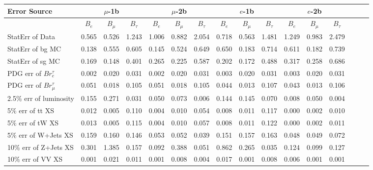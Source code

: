 \begin{sidewaystable}[p]
  \small
  \renewcommand{\arraystretch}{1.2}
  \centering

  \begin{tabular}{|l|ccc|ccc|ccc|ccc|ccc|}
  \hline
  Error Source & \multicolumn{3}{c|}{$\mu$-1b} & \multicolumn{3}{c|}{$\mu$-2b} & \multicolumn{3}{c|}{$e$-1b} & \multicolumn{3}{c|}{$e$-2b} \\
  \hline
                & $B_e$ & $B_\mu$ & $B_\tau$ & $B_e$ & $B_\mu$ & $B_\tau$ & $B_e$ & $B_\mu$ & $B_\tau$ & $B_e$ & $B_\mu$ & $B_\tau$ \\
  \hline
  StatErr of Data                            & 0.565 & 0.526 & 1.243 & 1.006 & 0.882 & 2.054 & 0.718 & 0.563 & 1.481 & 1.249 & 0.983 & 2.479 \\ 
  StatErr of bg MC                           & 0.138 & 0.555 & 0.605 & 0.145 & 0.524 & 0.649 & 0.650 & 0.183 & 0.714 & 0.611 & 0.182 & 0.739 \\ 
  StatErr of sg MC                           & 0.169 & 0.148 & 0.401 & 0.265 & 0.225 & 0.587 & 0.202 & 0.172 & 0.488 & 0.317 & 0.258 & 0.686 \\ 
  \hline
  PDG err of $Br^\tau_e$                     & 0.002 & 0.020 & 0.031 & 0.002 & 0.020 & 0.031 & 0.003 & 0.020 & 0.031 & 0.003 & 0.020 & 0.031 \\ 
  PDG err of $Br^\tau_\mu$                   & 0.051 & 0.018 & 0.105 & 0.051 & 0.018 & 0.105 & 0.044 & 0.013 & 0.107 & 0.043 & 0.013 & 0.106 \\ 
  2.5$\%$ err of luminosity                  & 0.155 & 0.271 & 0.031 & 0.050 & 0.073 & 0.006 & 0.144 & 0.145 & 0.070 & 0.008 & 0.050 & 0.004 \\ 
  5$\%$ err of tt XS                         & 0.012 & 0.005 & 0.110 & 0.004 & 0.010 & 0.054 & 0.008 & 0.011 & 0.117 & 0.000 & 0.002 & 0.010 \\ 
  5$\%$ err of tW XS                         & 0.013 & 0.005 & 0.115 & 0.004 & 0.010 & 0.057 & 0.008 & 0.011 & 0.122 & 0.000 & 0.002 & 0.011 \\ 
  5$\%$ err of W+Jets XS                     & 0.159 & 0.160 & 0.146 & 0.053 & 0.052 & 0.039 & 0.151 & 0.157 & 0.163 & 0.048 & 0.049 & 0.072 \\ 
  10$\%$ err of Z+Jets XS                    & 0.301 & 1.385 & 0.157 & 0.092 & 0.388 & 0.051 & 0.862 & 0.265 & 0.035 & 0.124 & 0.099 & 0.127 \\ 
  10$\%$ err of VV XS                        & 0.001 & 0.021 & 0.011 & 0.001 & 0.008 & 0.004 & 0.017 & 0.001 & 0.008 & 0.006 & 0.001 & 0.001 \\ 

\end{tabular}
\end{sidewaystable}
